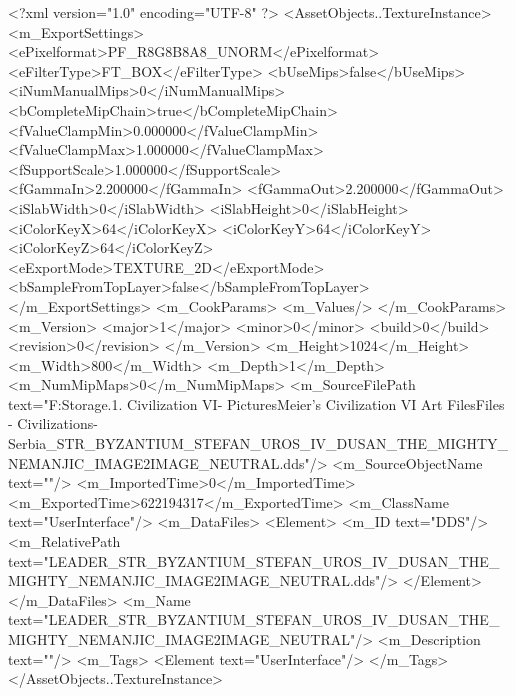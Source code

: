 <?xml version="1.0" encoding="UTF-8" ?>
<AssetObjects..TextureInstance>
	<m_ExportSettings>
		<ePixelformat>PF_R8G8B8A8_UNORM</ePixelformat>
		<eFilterType>FT_BOX</eFilterType>
		<bUseMips>false</bUseMips>
		<iNumManualMips>0</iNumManualMips>
		<bCompleteMipChain>true</bCompleteMipChain>
		<fValueClampMin>0.000000</fValueClampMin>
		<fValueClampMax>1.000000</fValueClampMax>
		<fSupportScale>1.000000</fSupportScale>
		<fGammaIn>2.200000</fGammaIn>
		<fGammaOut>2.200000</fGammaOut>
		<iSlabWidth>0</iSlabWidth>
		<iSlabHeight>0</iSlabHeight>
		<iColorKeyX>64</iColorKeyX>
		<iColorKeyY>64</iColorKeyY>
		<iColorKeyZ>64</iColorKeyZ>
		<eExportMode>TEXTURE_2D</eExportMode>
		<bSampleFromTopLayer>false</bSampleFromTopLayer>
	</m_ExportSettings>
	<m_CookParams>
		<m_Values/>
	</m_CookParams>
	<m_Version>
		<major>1</major>
		<minor>0</minor>
		<build>0</build>
		<revision>0</revision>
	</m_Version>
	<m_Height>1024</m_Height>
	<m_Width>800</m_Width>
	<m_Depth>1</m_Depth>
	<m_NumMipMaps>0</m_NumMipMaps>
	<m_SourceFilePath text="F:\Mod Storage\2.1. Civilization VI\Mods\Archive - Pictures\Sid Meier's Civilization VI Art Files\Art Files - Civilizations\Civilization - Serbia\LEADER_STR_BYZANTIUM_STEFAN_UROS_IV_DUSAN_THE_MIGHTY_NEMANJIC_IMAGE2IMAGE_NEUTRAL.dds"/>
	<m_SourceObjectName text=""/>
	<m_ImportedTime>0</m_ImportedTime>
	<m_ExportedTime>622194317</m_ExportedTime>
	<m_ClassName text="UserInterface"/>
	<m_DataFiles>
		<Element>
			<m_ID text="DDS"/>
			<m_RelativePath text="LEADER_STR_BYZANTIUM_STEFAN_UROS_IV_DUSAN_THE_MIGHTY_NEMANJIC_IMAGE2IMAGE_NEUTRAL.dds"/>
		</Element>
	</m_DataFiles>
	<m_Name text="LEADER_STR_BYZANTIUM_STEFAN_UROS_IV_DUSAN_THE_MIGHTY_NEMANJIC_IMAGE2IMAGE_NEUTRAL"/>
	<m_Description text=""/>
	<m_Tags>
		<Element text="UserInterface"/>
	</m_Tags>
</AssetObjects..TextureInstance>

